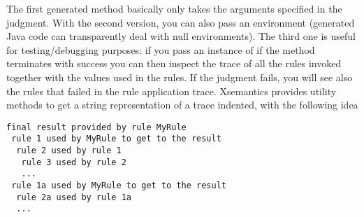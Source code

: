 The first generated method basically only takes the arguments specified in the
judgment.  With the second version, you can also pass an environment
(generated Java code can transparently deal with null environments).
The third one is useful for testing/debugging purposes: if you pass
an instance of  if the
method terminates with success you can then inspect the trace of all the rules
invoked together with the values used in the rules.  If the judgment fails,
you will see also the rules that failed in the rule application trace.
Xsemantics provides utility methods to get a string representation of a trace
indented, with the following idea

\begin{footnotesize}
\begin{verbatim}
final result provided by rule MyRule
 rule 1 used by MyRule to get to the result
  rule 2 used by rule 1
   rule 3 used by rule 2
   ...
 rule 1a used by MyRule to get to the result
  rule 2a used by rule 1a
  ...
\end{verbatim}
\end{footnotesize}
